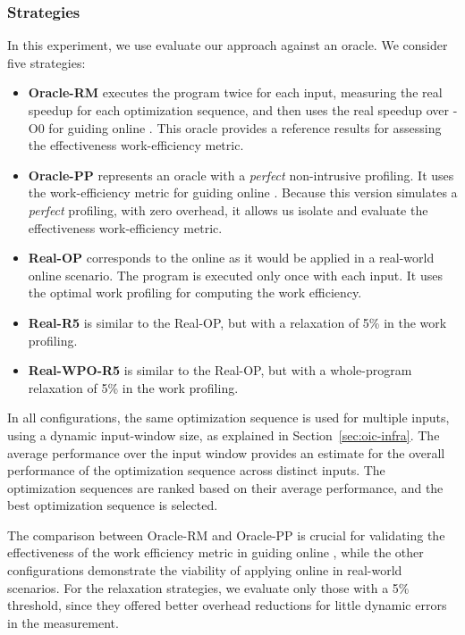 \subsubsection{\Itercomp Strategies}
In this experiment, we use evaluate our \itercomp approach against an oracle. We consider five \itercomp strategies:
\begin{itemize}[leftmargin=3mm]
\item \textbf{Oracle-RM} executes the program twice for each input, measuring the real speedup for each optimization sequence, and then uses the real speedup over {\flagstype -O0} for guiding online {\itercomp}. This oracle provides a reference results for assessing the effectiveness work-efficiency metric.
\item \textbf{Oracle-PP} represents an oracle with a \textit{perfect} non-intrusive profiling.
  It uses the work-efficiency metric for guiding online {\itercomp}.
  Because this version simulates a \textit{perfect} profiling, with zero overhead,
  it allows us isolate and evaluate the effectiveness work-efficiency metric.
\item \textbf{Real-OP} corresponds to the online {\itercomp} as it would be applied in a real-world online scenario.
  The program is executed only once with each input.
  It uses the optimal work profiling for computing the work efficiency.
\item \textbf{Real-R5} is similar to the {Real-OP}, but with a relaxation of 5\% in the work profiling.
\item \textbf{Real-WPO-R5} is similar to the {Real-OP}, but with a whole-program relaxation of 5\% in the work profiling.
\end{itemize}

In all configurations, the same optimization sequence is used for multiple inputs, using a dynamic input-window size, as explained in
Section~\ref{sec:oic-infra}. The average performance over the input window provides an estimate for the overall performance of the
optimization sequence across distinct inputs. The optimization sequences are ranked based on their average performance, and the best
optimization sequence is selected.

The comparison between Oracle-RM and Oracle-PP is crucial for validating the
effectiveness of the work efficiency metric in guiding online {\itercomp},
while the other configurations demonstrate the viability of applying online
{\itercomp} in real-world scenarios.
For the relaxation strategies, we evaluate only those with a 5\% threshold, since
they offered better overhead reductions for little dynamic errors in the measurement.

